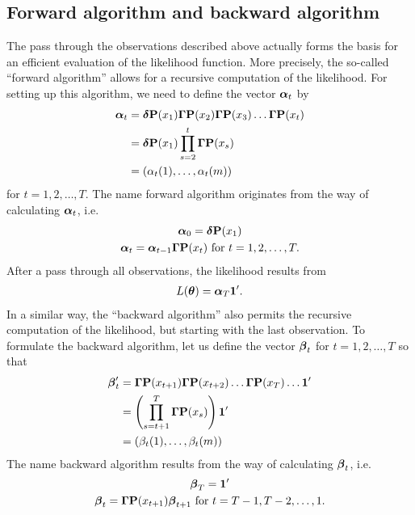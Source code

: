 \documentclass[bimj,fleqn]{w-art}\usepackage[]{graphicx}\usepackage[]{color}
\newcommand{\bcp}{{\bf P}}
\newcommand{\bgamma}{\mbox{\boldmath $\Gamma$}}
\newcommand{\btheta}{\mbox{\boldmath $\theta$}}
\newcommand{\balpha}{\mbox{\boldmath $\alpha$}}
\newcommand{\bfbeta}{\mbox{\boldmath $\beta$}}
\newcommand{\bfdelta}{\mbox{\boldmath $\delta$}}
\newcommand{\bone}{{\bf 1}}
\theoremstyle{plain}
\theoremstyle{definition}
\begin{document}
\subsection{Forward algorithm and backward algorithm}
\label{sec:hmm_fwbw}

The pass through the observations described above actually forms the basis for an efficient evaluation of the  likelihood function. More precisely, the so-called ``forward algorithm'' allows for a recursive computation of the likelihood. For setting up this algorithm, we need to define the vector $\balpha_t$ by
\begin{align*}
\balpha_t &= \bfdelta \bcp(x_1)\bgamma \bcp(x_2) \bgamma \bcp(x_3) \ldots \bgamma \bcp(x_t)\\
&= \bfdelta \bcp(x_1) \prod_{s=2}^{t}\bgamma \bcp(x_s)\\
&= \left( \alpha_t(1), \ldots, \alpha_t(m) \right)
\end{align*}
for $t = 1, 2, \ldots, T$. 
The name forward algorithm originates from the way of calculating $\balpha_t$, i.e.
\begin{gather*}
\balpha_0 = \bfdelta \bcp(x_1)\\
\balpha_t = \balpha_{t-1} \bgamma \bcp(x_t) \text{ for } t = 1, 2, \ldots, T.
\end{gather*}
After a pass through all observations, the likelihood results from
\begin{gather*}
L(\btheta) = \balpha_T \bone'.
\end{gather*}
In a similar way, the ``backward algorithm'' also permits the recursive computation of the likelihood, but starting with the last observation. To formulate the backward algorithm, let us define the vector $\bfbeta_t$ for $t = 1, 2,
\ldots, T$ so that
\begin{align*}
\bfbeta'_t &= \bgamma \bcp(x_{t+1}) \bgamma \bcp(x_{t+2}) \ldots \bgamma \bcp(x_T) \ldots \bone'\\
&= \left(\prod_{s=t+1}^{T}\bgamma \bcp(x_s) \right) \bone'\\
&= \left( \beta_t(1), \ldots, \beta_t(m) \right)
\end{align*}
The name backward algorithm results from the way of calculating $\bfbeta_t$, i.e.
\begin{gather*}
\bfbeta_T = \bone'\\
\bfbeta_t = \bgamma \bcp(x_{t+1}) \bfbeta_{t+1} \text{ for } t = T-1, T-2, \ldots, 1.
\end{gather*}
\end{document}
